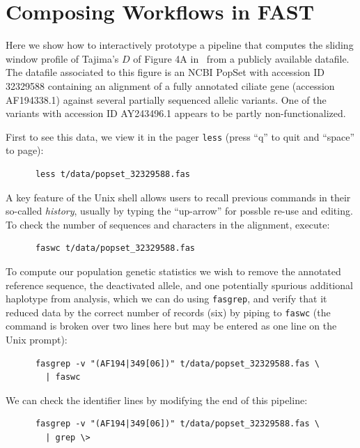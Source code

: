 \documentclass{frontiersSCNS} %
\begin{document}
\section{Composing Workflows in FAST}

Here we show how to interactively prototype a pipeline that computes
the sliding window profile of Tajima's $D$ of Figure 4A
in~\citep{Ardell03} from a publicly available datafile. The datafile
associated to this figure is an NCBI PopSet with accession ID 32329588
containing an alignment of a fully annotated ciliate gene (accession
AF194338.1) against several partially sequenced allelic variants. One
of the variants with accession ID AY243496.1 appears to be partly
non-functionalized.

First to see this data, we view it in the pager {\tt less} (press
``q'' to quit and ``space'' to page):

\begin{verbatim}
      less t/data/popset_32329588.fas
\end{verbatim}

\noindent A key feature of the Unix shell allows users to recall previous
commands in their so-called {\it history}, usually by typing the
``up-arrow'' for possble re-use and editing. To check the number of
sequences and characters in the alignment, execute:

\begin{verbatim}
      faswc t/data/popset_32329588.fas
\end{verbatim}

\noindent To compute our population genetic statistics we wish to
remove the annotated reference sequence, the deactivated allele, and
one potentially spurious additional haplotype from analysis, which we
can do using {\tt fasgrep}, and verify that it reduced data by the
correct number of records (six) by piping to {\tt faswc} (the command
is broken over two lines here but may be entered as one line on the
Unix prompt):

\begin{verbatim}
      fasgrep -v "(AF194|349[06])" t/data/popset_32329588.fas \
        | faswc
\end{verbatim}

\noindent We can check the identifier lines by modifying the end of
this pipeline:

\begin{verbatim}
      fasgrep -v "(AF194|349[06])" t/data/popset_32329588.fas \ 
        | grep \>
\end{verbatim}
\end{document}
